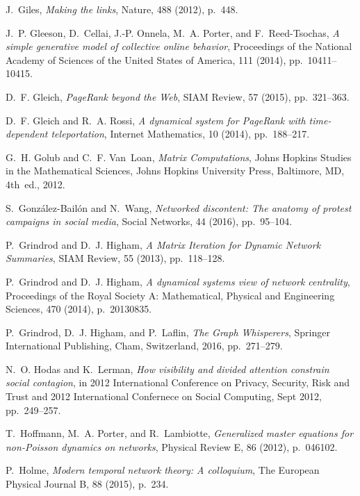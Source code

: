 \documentclass[journal,transmag]{IEEEtran}
\begin{document}
\begin{thebibliography}{10}
{\sc J.~Giles}, {\em Making the links}, Nature, 488 (2012), p.~448.

{\sc J.~P. Gleeson, D.~Cellai, J.-P. Onnela, M.~A. Porter, and
  F.~Reed-Tsochas}, {\em A simple generative model of collective online
  behavior}, {Proceedings of the National Academy of Sciences of the United
  States of America}, 111 (2014), pp.~10411--10415.

{\sc D.~F. Gleich}, {\em {PageRank beyond the Web}}, {SIAM Review}, 57 (2015),
  pp.~321--363.

{\sc D.~F. Gleich and R.~A. Rossi}, {\em A dynamical system for {PageRank} with
  time-dependent teleportation}, Internet Mathematics, 10 (2014), pp.~188--217.

{\sc G.~H. Golub and C.~F. Van~Loan}, {\em Matrix Computations}, Johns Hopkins
  Studies in the Mathematical Sciences, Johns Hopkins University Press,
  Baltimore, MD, 4th~ed., 2012.

{\sc S.~Gonz{\'a}lez-Bail{\'o}n and N.~Wang}, {\em {Networked discontent: The
  anatomy of protest campaigns in social media}}, Social Networks, 44 (2016),
  pp.~95--104.

{\sc P.~Grindrod and D.~J. Higham}, {\em {A Matrix Iteration for Dynamic
  Network Summaries}}, {SIAM Review}, 55 (2013), pp.~118--128.

{\sc P.~Grindrod and D.~J. Higham}, {\em A dynamical systems view of network
  centrality}, Proceedings of the Royal Society A: Mathematical, Physical and
  Engineering Sciences, 470 (2014), p.~20130835.

{\sc P.~Grindrod, D.~J. Higham, and P.~Laflin}, {\em The Graph Whisperers},
  Springer International Publishing, Cham, Switzerland, 2016, pp.~271--279.

{\sc N.~O. Hodas and K.~Lerman}, {\em How visibility and divided attention
  constrain social contagion}, in 2012 International Conference on Privacy,
  Security, Risk and Trust and 2012 International Confernece on Social
  Computing, Sept 2012, pp.~249--257.

{\sc T.~Hoffmann, M.~A. Porter, and R.~Lambiotte}, {\em {Generalized master
  equations for non-{P}oisson dynamics on networks}}, {Physical Review E}, 86
  (2012), p.~046102.

{\sc P.~Holme}, {\em {Modern temporal network theory: {A} colloquium}}, The
  European Physical Journal B, 88 (2015), p.~234.


\end{thebibliography}
\end{document}
